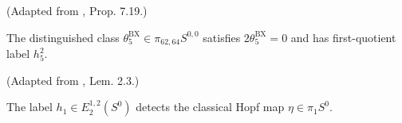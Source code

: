 


\begin{theorem}
\label{frontier:Literature:cb4dd3fedc28}
(Adapted from \cite{BurklundXu}, Prop. 7.19.)\par{}

The distinguished class $\theta_5^{\mathrm{BX}}\in\pi_{62,64}S^{0,0}$ satisfies $2\theta_5^{\mathrm{BX}}=0$ and has first-quotient label $h_5^2$.
\end{theorem}

\begin{theorem}
\label{frontier:Literature:da6f8834fbe5}
(Adapted from \cite{Adams58}, Lem. 2.3.)\par{}

The label $h_1\in E_2^{1,2}(S^0)$ detects the classical Hopf map $\eta\in\pi_1S^0$.
\end{theorem}

